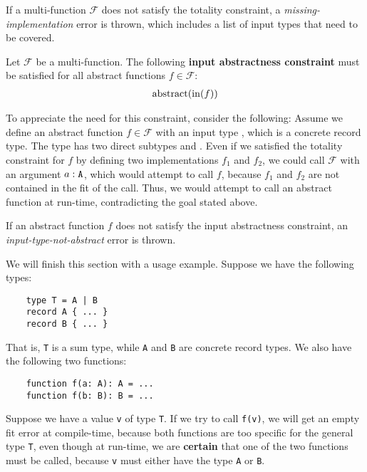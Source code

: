 If a multi-function $\mathcal{F}$ does not satisfy the totality constraint, a \textit{missing-implementation} error is thrown, which includes a list of input types that need to be covered.

\begin{definition} \label{def:input-abstractness-constraint}
	Let $\mathcal{F}$ be a multi-function. The following \textbf{input abstractness constraint} must be satisfied for all abstract functions $f \in \mathcal{F}$: 
	\begin{align*}
		\operatorname{abstract}(\operatorname{in}(f))
	\end{align*}
\end{definition}

\noindent To appreciate the need for this constraint, consider the following: Assume we define an abstract function $f \in \mathcal{F}$ with an input type , which is a concrete record type. The type  has two direct subtypes  and . Even if we satisfied the totality constraint for $f$ by defining two implementations $f_1$ and $f_2$, we could call $\mathcal{F}$ with an argument $a : \texttt{A}$, which would attempt to call $f$, because $f_1$ and $f_2$ are not contained in the fit of the call. Thus, we would attempt to call an abstract function at run-time, contradicting the goal stated above.

If an abstract function $f$ does not satisfy the input abstractness constraint, an \textit{input-type-not-abstract} error is thrown.

\medskip

\noindent We will finish this section with a usage example. Suppose we have the following types:
\begin{lstlisting}
    type T = A | B
    record A { ... }
    record B { ... }
\end{lstlisting}

\noindent That is, \texttt{T} is a sum type, while \texttt{A} and \texttt{B} are concrete record types. We also have the following two functions:
\begin{lstlisting}
    function f(a: A): A = ...
    function f(b: B): B = ...
\end{lstlisting}

\noindent Suppose we have a value \texttt{v} of type \texttt{T}. If we try to call \texttt{f(v)}, we will get an empty fit error at compile-time, because both functions are too specific for the general type \texttt{T}, even though at run-time, we are \textbf{certain} that one of the two functions must be called, because \texttt{v} must either have the type \texttt{A} or \texttt{B}.


